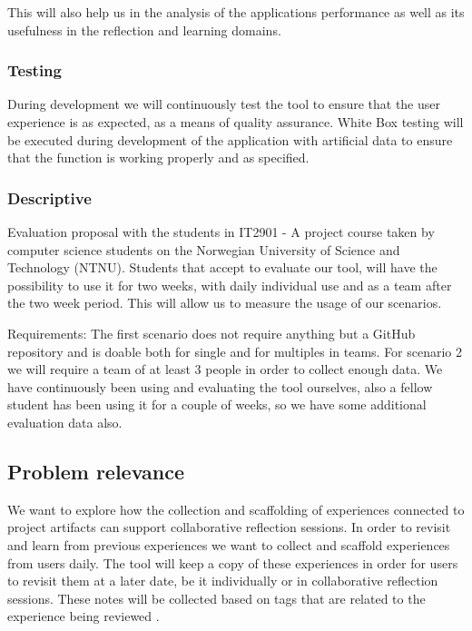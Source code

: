 This will also help us in the analysis of the applications performance as well as its usefulness in the reflection and learning domains.

\subsubsection{Testing}
During development we will continuously test the tool to ensure that the user experience is as expected, as a means of quality assurance.
White Box testing will be executed during development of the application with artificial data to ensure that the function is working properly and as specified. 

\subsubsection{Descriptive}
Evaluation proposal with the students in IT2901 - A project course taken by computer science students on the Norwegian University of Science and Technology (NTNU). 
Students that accept to evaluate our tool, will have the possibility to use it for two weeks, with daily individual use and as a team after the two week period. This will allow us to measure the usage of our scenarios. 

Requirements: 
The first scenario does not require anything but a GitHub repository and is doable both for single and for multiples in teams.
For scenario 2 we will require a team of at least 3 people in order to collect enough data. 
We have continuously been using and evaluating the tool ourselves, also a fellow student has been using it for a couple of weeks, so we have some additional evaluation
data also.


\subsection{Problem relevance}
We want to explore how the collection and scaffolding of experiences connected to project artifacts can support collaborative reflection sessions. In order to revisit and learn from previous experiences we want to collect and scaffold experiences from users daily. The tool will keep a copy of these experiences in order for users to revisit them at a later date, be it individually or in collaborative reflection sessions. These notes will be collected based on tags that are related to the experience being reviewed \citep{Hassan-montero2006}.

